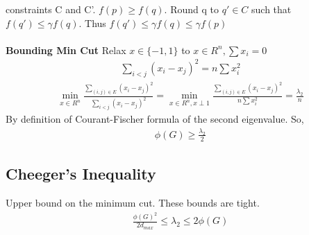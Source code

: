 \documentclass[12pt, letterpaper]{report}
\begin{document}
    constraints C and C'. $f(p)\geq f(q)$. Round q to $q'\in C$ such that $f(q') \leq \gamma f(q)$. Thus $f(q')\leq\gamma f(q)\leq\gamma f(p)$\\\\
    \textbf{Bounding Min Cut}
    Relax $x\in\{-1, 1\}$ to $x\in R^n, \sum{x_i}=0$
    \begin{gather*}
        \sum_{i<j}(x_i-x_j)^2=n\sum{x_i^2}
    \end{gather*}
    \begin{gather*}
        \min_{x\in R^n}\frac{\sum_{(i,j)\in E}(x_i-x_j)^2}{\sum_{i<j}(x_i-x_j)^2} = \min_{x\in R^n, x\perp 1}\frac{\sum_{(i,j)\in E}(x_i-x_j)^2}{n\sum x_i^2}=\frac{\lambda_2}{n}
    \end{gather*}
    By definition of Courant-Fischer formula of the second eigenvalue. So,
    \begin{gather*}
        \phi(G) \geq \frac{\lambda_2}{2}
    \end{gather*}
    \subsection{Cheeger's Inequality}
    Upper bound on the minimum cut. These bounds are tight.
    \begin{gather*}
        \frac{\phi(G)^2}{2d_{max}}\leq \lambda_2 \leq 2\phi(G)
    \end{gather*}
\end{document}
